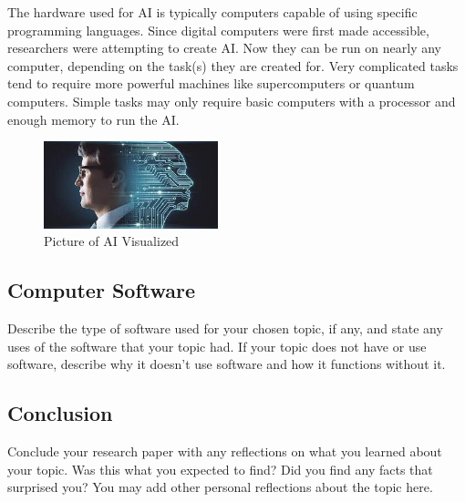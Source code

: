 \documentclass[11pt, twocolumn]{article}
\begin{document}
The hardware used for AI is typically computers capable of using specific programming
languages. Since digital computers were first made accessible, researchers were
attempting to create AI. Now they can be run on nearly any computer, depending on the
task(s) they are created for. Very complicated tasks tend to require more powerful
machines like supercomputers or quantum computers. Simple tasks may only require
basic computers with a processor and enough memory to run the AI.

\begin{figure}
    \centering
    \includegraphics[width=0.45\textwidth]{AI}
    \caption{Picture of AI Visualized}
    \label{fig:AI}
\end{figure}

\subsection{Computer Software}
Describe the type of software used for your chosen topic, if any, and state any uses
of the software that your topic had. If your topic does not have or use software, 
describe why it doesn't use software and how it functions without it.

\subsection{Conclusion}
Conclude your research paper with any reflections on what you learned about your 
topic. Was this what you expected to find? Did you find any facts that surprised you?
You may add other personal reflections about the topic here.



\end{document}
